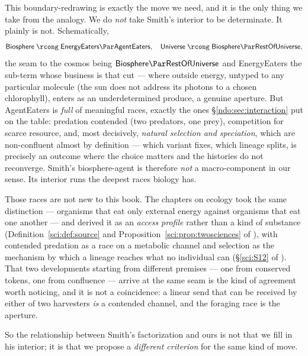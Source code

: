This boundary-redrawing is exactly the move we need, and it is the only thing we take
from the analogy. We do \emph{not} take Smith's interior to be determinate. It plainly
is not. Schematically,
\[
\textsf{Biosphere} \;\rcong\; \textsf{EnergyEaters} \Par \textsf{AgentEaters},
\quad
\textsf{Universe} \;\rcong\; \textsf{Biosphere} \Par \textsf{RestOfUniverse},
\]
the seam to the cosmos being $\textsf{Biosphere} \Par \textsf{RestOfUniverse}$ and
\textsf{EnergyEaters} the sub-term whose business is that cut --- where outside energy,
untyped to any particular molecule (the sun does not address its photons to a chosen
chlorophyll), enters as an underdetermined produce, a genuine aperture. But
\textsf{AgentEaters} is \emph{full} of meaningful races, exactly the ones
\S\ref{ndo:sec:interaction} put on the table: predation contended (two predators, one
prey), competition for scarce resource, and, most decisively, \emph{natural selection
and speciation}, which are non-confluent almost by definition --- which variant fixes,
which lineage splits, is precisely an outcome where the choice matters and the
histories do not reconverge. Smith's biosphere-agent is therefore \emph{not} a
macro-component in our sense. Its interior runs the deepest races biology has.

Those races are not new to this book. The chapters on ecology took the same
distinction --- organisms that eat only external energy against organisms that eat one
another --- and derived it as an \emph{access profile} rather than a kind of substance
(Definition~\ref{sci:def:source} and Proposition~\ref{sci:prop:twosciences} of
\chSci), with contended predation as a race on a metabolic channel and selection as
the mechanism by which a lineage reaches what no individual can
(\S\ref{sci:S12} of \chSci). That two developments starting from different premises
--- one from conserved tokens, one from confluence --- arrive at the same seam is the
kind of agreement worth noticing, and it is not a coincidence: a linear send that can
be received by either of two harvesters \emph{is} a contended channel, and the
foraging race is the aperture.

So the relationship between Smith's factorization and ours is not that we fill in his
interior; it is that we propose a \emph{different criterion} for the same kind of move.


